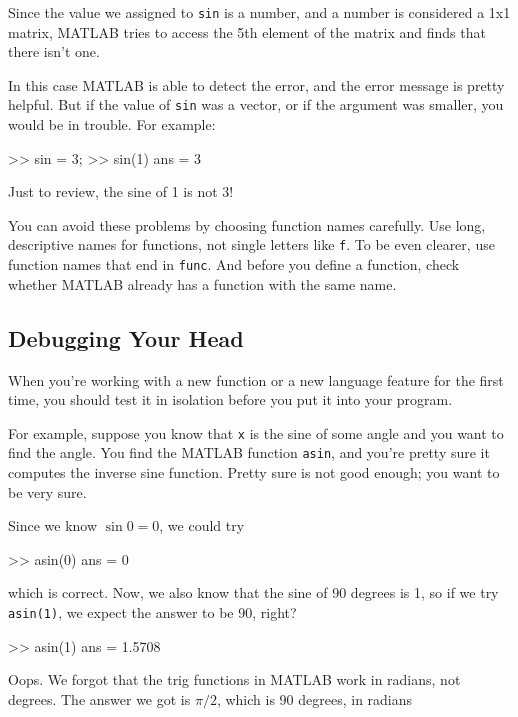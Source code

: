 Since the value we assigned to {\tt sin} is a number, and a number is considered a 1x1 matrix, MATLAB tries to access the 5th element of the matrix and finds that there isn't one.

In this case MATLAB is able to detect the error, and the error message is pretty helpful.
But if the value of {\tt sin} was a vector, or if the argument was smaller, you would be in trouble.  For example:

\begin{code}
>> sin = 3;
>> sin(1)
ans = 3
\end{code}

Just to review, the sine of 1 is not 3!

You can avoid these problems by choosing function names carefully. Use long, descriptive names for functions, not single letters like {\tt f}. To be even clearer, use function names that end in {\tt func}. And before you define a function, check whether MATLAB already has a function with the same name.

\subsection{Debugging Your Head}

When you're working with a new function or a new language feature
for the first time, you should test it in isolation before you
put it into your program.


For example, suppose you know that {\tt x} is the sine of some
angle and you want to find the angle.  You find the MATLAB function
{\tt asin}, and you're pretty sure it computes the inverse sine
function.  Pretty sure is not good enough; you want to be very sure.

Since we know $\sin 0 = 0$, we could try

\begin{code}
>> asin(0)
ans = 0
\end{code}

which is correct.  Now, we also know that the sine of 90 degrees is
1, so if we try {\tt asin(1)}, we expect the answer to be 90, right?

\begin{code}
>> asin(1)
ans = 1.5708
\end{code}

Oops.  We forgot that the trig functions in MATLAB work in radians,
not degrees.  The answer we got is $\pi/2$, which is 90 degrees, in radians

